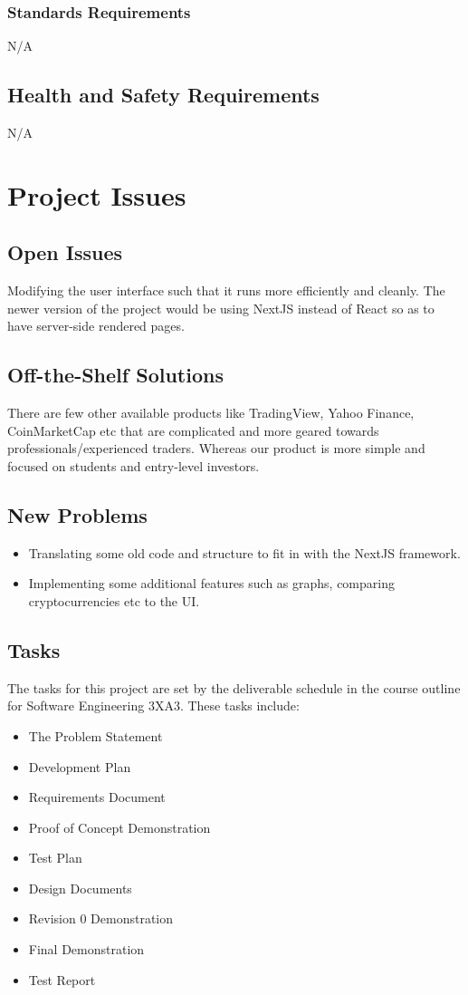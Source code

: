 \documentclass[12pt, titlepage]{article}
\begin{document}
\subsubsection{Standards Requirements}
N/A

\subsection{Health and Safety Requirements}
N/A


\section{Project Issues}

\subsection{Open Issues}
Modifying the user interface such that it runs more efficiently and cleanly. The newer version of the project would be using NextJS instead of React so as to have server-side rendered pages. 


\subsection{Off-the-Shelf Solutions}
There are few other available products like TradingView, Yahoo Finance, CoinMarketCap etc that are complicated and more geared towards professionals/experienced traders. Whereas our product is more simple and focused on students and entry-level investors.  

\subsection{New Problems}
\begin{itemize}
    \item Translating some old code and structure to fit in with the NextJS framework.
    \item Implementing some additional features such as graphs, comparing cryptocurrencies etc to the UI. 
\end{itemize}

\subsection{Tasks}
The tasks for this project are set by the deliverable schedule in the course outline for Software Engineering 3XA3. These tasks include: 
\begin{itemize}
    \item The Problem Statement
    \item Development Plan 
    \item Requirements Document
    \item Proof of Concept Demonstration
    \item Test Plan
    \item Design Documents
    \item Revision 0 Demonstration 
    \item Final Demonstration 
    \item Test Report
\end{itemize}
\end{document}
